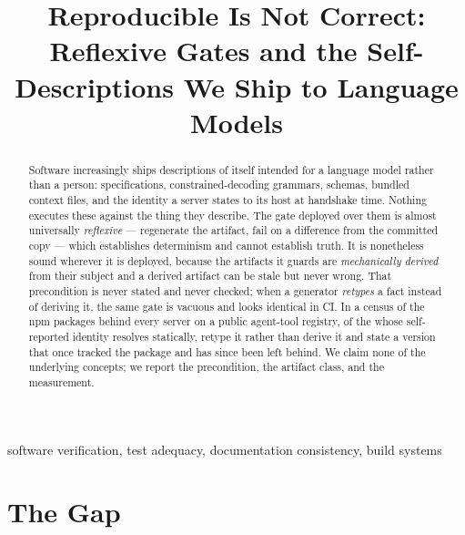 \documentclass[10pt,conference]{IEEEtran}
\begin{document}
\title{Reproducible Is Not Correct: Reflexive Gates and the Self-Descriptions We Ship to Language Models}

\author{}

\maketitle

\begin{abstract}
Software increasingly ships descriptions of itself intended for a language model rather
than a person: specifications, constrained-decoding grammars, schemas, bundled context
files, and the identity a server states to its host at handshake time. Nothing executes
these against the thing they describe. The gate deployed over them is almost universally
\emph{reflexive} --- regenerate the artifact, fail on a difference from the committed copy
--- which establishes determinism and cannot establish truth. It is nonetheless sound
wherever it is deployed, because the artifacts it guards are \emph{mechanically derived}
from their subject and a derived artifact can be stale but never wrong. That precondition
is never stated and never checked; when a generator \emph{retypes} a fact instead of
deriving it, the same gate is vacuous and looks identical in CI. In a census of the
\factEcoPackages{} npm packages behind every server on a public agent-tool registry, of
the \factEcoApplicable{} whose self-reported identity resolves statically,
\factEcoRetypedPct{} retype it rather than derive it and \factEcoDriftConfirmedPct{}
state a version that once tracked the package and has since been left behind. We claim
none of the underlying concepts; we report the precondition, the artifact class, and the
measurement.
\end{abstract}

\begin{IEEEkeywords}
software verification, test adequacy, documentation consistency, build systems
\end{IEEEkeywords}

\section{The Gap}
\end{document}
